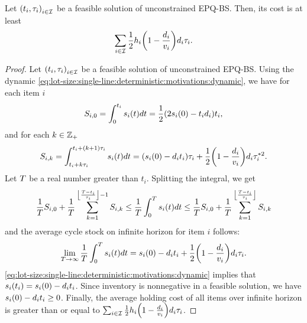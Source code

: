 \begin{lem}\label{lem:lot-size:deterministic:single-line:models:ZIO}
Let $\bracket{t_i,\cover_i}_{i\in\REF}$ be a feasible solution of unconstrained EPQ-BS.
Then, its cost is at least
\begin{equation}
  \sum_{i\in\REF}\frac{1}{2}\holding_i\bracket{1-\frac{\demand_i}{\rate_i}}\demand_i\cover_i.
\end{equation}
\end{lem}


\begin{proof}
Let $\bracket{t_i,\cover_i}_{i\in\REF}$ be a feasible solution of unconstrained EPQ-BS.
Using the dynamic \eqref{eq:lot-size:single-line:deterministic:motivations:dynamic}, we have for each item $i$
\begin{equation}
  S_{i,0}
  =
  \int_0^{t_i}\inventory_i\bracket{t}dt
  = \frac{1}{2}\bracket{2\inventory_i\bracket{0}-t_i\demand_i}t_i,
\end{equation}
and for each $k\in\mathbb{Z}_+$
\begin{equation}
  S_{i,k}
  =
  \int_{t_i+k\cover_i}^{t_i+\bracket{k+1}\cover_i}\inventory_i(t)dt
  =
  \bracket{\inventory_i(0)-\demand_i t_i}\cover_i
  + \frac{1}{2}\bracket{1-\frac{\demand_i}{\rate_i}}\demand_i\cover_i^{*2}.
\end{equation}
Let $T$ be a real number greater than $t_i$.
Splitting the integral, we get
\begin{equation}
  \frac{1}{\horizon} S_{i,0}
  + \frac{1}{\horizon} \sum_{k=1}^{\left\lfloor\frac{\horizon-t_i}{\cover_i}\right\rfloor-1} S_{i,k}
  \le
  \frac{1}{\horizon} \int_0^{\horizon}\inventory_i\bracket{t}dt
  \le
  \frac{1}{\horizon} S_{i,0}
  + \frac{1}{\horizon} \sum_{k=1}^{\left\lfloor\frac{\horizon-t_i}{\cover_i}\right\rfloor} S_{i,k}
\end{equation}
and the average cycle stock on infinite horizon for item $i$ follows:
\begin{equation}
  \lim_{\horizon\rightarrow\infty} \frac{1}{\horizon} \int_0^{\horizon}\inventory_i\bracket{t}dt
  =
  \inventory_i(0)-\demand_i t_i
  + \frac{1}{2}\bracket{1-\frac{\demand_i}{\rate_i}}\demand_i\cover_i.
\end{equation}
\cref{eq:lot-size:single-line:deterministic:motivations:dynamic} implies that $\inventory_i\bracket{t_i}=\inventory_i(0)-\demand_i t_i$.
Since inventory is nonnegative in a feasible solution, we have $s_i(0)-d_i t_i\ge0$.
Finally, the average holding cost of all items over infinite horizon is greater than or equal to
$\sum_{i\in\REF}\frac{1}{2}\holding_i\bracket{1-\frac{\demand_i}{\rate_i}}\demand_i\cover_i$.
\end{proof}



